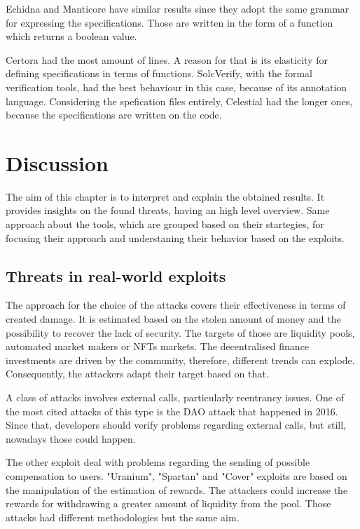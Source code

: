 Echidna and Manticore have similar results since they adopt the same grammar for expressing the specifications. 
Those are written in the form of a function which returns a boolean value.

Certora had the most amount of lines. A reason for that is its elasticity for defining specifications in terms of functions. 
SolcVerify, with the formal verification tools, had the best behaviour in this case, because of its annotation language. 
Considering the spefication files entirely, Celestial had the longer ones, because the specifications are written on the code.

\chapter{Discussion}
\label{ch:Discussion}

The aim of this chapter is to interpret and explain the obtained results. 
It provides insights on the found threats, having an high level overview. 
Same approach about the tools, which are grouped based on their startegies, for focusing their approach and understaning their behavior based on the exploits.

\section{Threats in real-world exploits}

The approach for the choice of the attacks covers their effectiveness in terms of created damage. 
It is estimated based on the stolen amount of money and the possibility to recover the lack of security. 
The targets of those are liquidity pools, automated market makers or NFTs markets. 
The decentralised finance investments are driven by the community, therefore, different trends can explode. 
Consequently, the attackers adapt their target based on that.

A class of attacks involves external calls, particularly reentrancy issues. 
One of the most cited attacks of this type is the DAO attack that happened in 2016. 
Since that, developers should verify problems regarding external calls, but still, nowadays those could happen. 

The other exploit deal with problems regarding the sending of possible compensation to users. 
"Uranium", "Spartan" and "Cover" exploits are based on the manipulation of the estimation of rewards. 
The attackers could increase the rewards for withdrawing a greater amount of liquidity from the pool. Those attacks had different methodologies but the same aim. 


